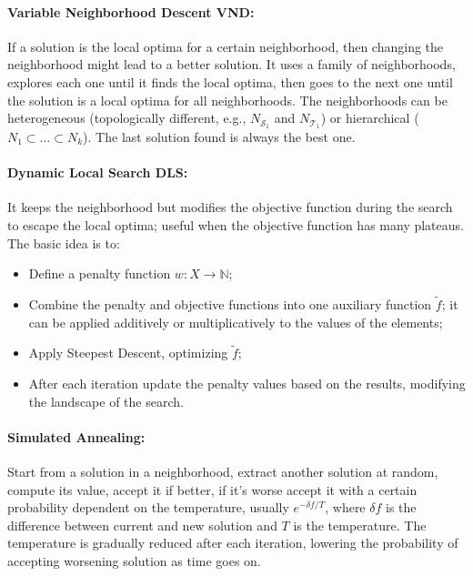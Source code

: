 \documentclass{article}
\begin{document}
	\paragraph{Variable Neighborhood Descent VND:} If a solution is the local optima for a certain neighborhood, then changing the neighborhood might lead to a better solution. It uses a family of neighborhoods, explores each one until it finds the local optima, then goes to the next one until the solution is a local optima for all neighborhoods. The neighborhoods can be heterogeneous (topologically different, e.g., $N_{\mathcal{S}_1}$ and $N_{\mathcal{T}_1}$) or hierarchical ($N_1 \subset \dots \subset N_k$). The last solution found is always the best one.\\
	
	\paragraph{Dynamic Local Search DLS:} It keeps the neighborhood but modifies the objective function during the search to escape the local optima; useful when the objective function has many plateaus. The basic idea is to: 
	\begin{itemize}
		\item Define a penalty function $w: X \rightarrow \mathbb{N}$;
		\item Combine the penalty and objective functions into one auxiliary function $\tilde f$; it can be applied additively or multiplicatively to the values of the elements;
		\item Apply Steepest Descent, optimizing $\tilde f$;
		\item After each iteration update the penalty values based on the results, modifying the landscape of the search.\\
	\end{itemize}
	
	\paragraph{Simulated Annealing:} Start from a solution in a neighborhood, extract another solution at random, compute its value, accept it if better, if it's worse accept it with a certain probability dependent on the temperature, usually $e^{-\delta f / T}$, where $\delta f$ is the difference between current and new solution and $T$ is the temperature. The temperature is gradually reduced after each iteration, lowering the probability of accepting worsening solution as time goes on.\\
	
\end{document}
